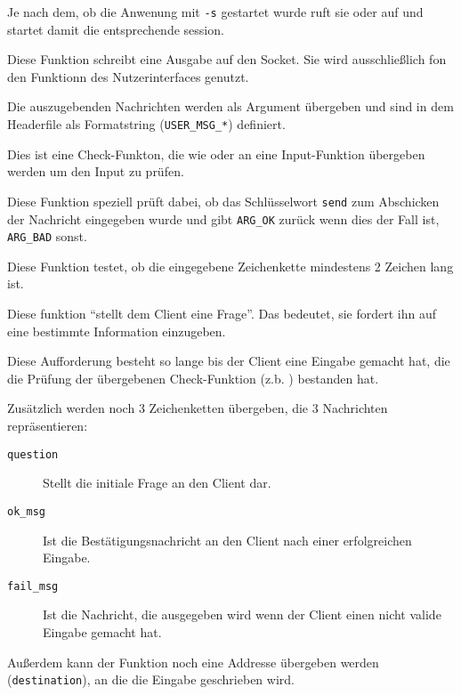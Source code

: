 Je nach dem, ob die Anwenung mit \texttt{-s} gestartet wurde ruft sie  oder  auf und startet damit die entsprechende session.


\label{fn:user_write_msg}
Diese Funktion schreibt eine Ausgabe auf den Socket. Sie wird ausschließlich fon den Funktionn des Nutzerinterfaces genutzt.

Die auszugebenden Nachrichten werden als Argument \"{u}bergeben und sind in dem Headerfile  als Formatstring (\texttt{USER\_MSG\_*}) definiert.

\label{fn:user_check_confirm}
Dies ist eine Check-Funkton, die wie  oder  an eine Input-Funktion \"{u}bergeben werden um den Input zu pr\"{u}fen.

Diese Funktion speziell pr\"{u}ft dabei, ob das Schl\"{u}sselwort \texttt{send} zum Abschicken der Nachricht eingegeben wurde und gibt \texttt{ARG\_OK} zur\"{u}ck wenn dies der Fall ist, \texttt{ARG\_BAD} sonst.

\label{user_check_noempty}
Diese Funktion testet, ob die eingegebene Zeichenkette mindestens 2 Zeichen lang ist.

\label{fn:user_ask_client}
Diese funktion ``stellt dem Client eine Frage''. Das bedeutet, sie fordert ihn auf eine bestimmte Information einzugeben.

Diese Aufforderung besteht so lange bis der Client eine Eingabe gemacht hat, die die Pr\"{u}fung der \"{u}bergebenen Check-Funktion (z.b. ) bestanden hat.

Zus\"{a}tzlich werden noch 3 Zeichenketten \"{u}bergeben, die 3 Nachrichten repr\"{a}sentieren:
\begin{description}
  \item[\texttt{question}] Stellt die initiale Frage an den Client dar.
  \item[\texttt{ok\_msg}] Ist die Best\"{a}tigungsnachricht an den Client nach einer erfolgreichen Eingabe.
  \item[\texttt{fail\_msg}] Ist die Nachricht, die ausgegeben wird wenn der Client einen nicht valide Eingabe gemacht hat. 
\end{description}

Außerdem kann der Funktion noch eine Addresse \"{u}bergeben werden (\texttt{destination}), an die die Eingabe geschrieben wird.

